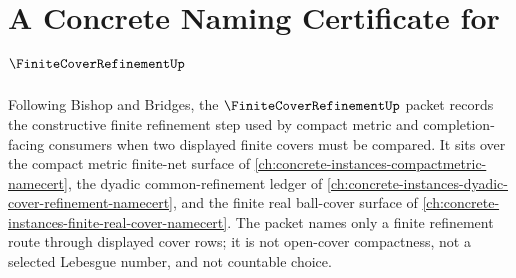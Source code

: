\chapter{A Concrete Naming Certificate for $\FiniteCoverRefinementUp$}
\label{ch:concrete-instances-finite-cover-refinement-namecert}

Following Bishop and Bridges, the $\FiniteCoverRefinementUp$ packet records the constructive finite refinement step used by compact metric and completion-facing consumers when two displayed finite covers must be compared. It sits over the compact metric finite-net surface of \autoref{ch:concrete-instances-compactmetric-namecert}, the dyadic common-refinement ledger of \autoref{ch:concrete-instances-dyadic-cover-refinement-namecert}, and the finite real ball-cover surface of \autoref{ch:concrete-instances-finite-real-cover-namecert}. The packet names only a finite refinement route through displayed cover rows; it is not open-cover compactness, not a selected Lebesgue number, and not countable choice.

